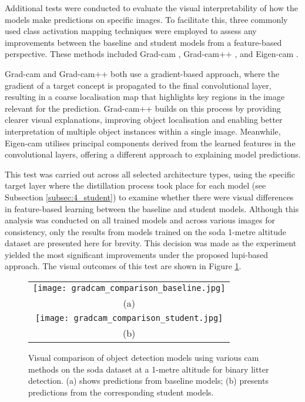 Additional tests were conducted to evaluate the visual interpretability of how the models make predictions on specific images. To facilitate this, three commonly used class activation mapping techniques were employed to assess any improvements between the baseline and student models from a feature-based perspective. These methods included Grad-\gls{cam} \cite{gradcam}, Grad-\gls{cam}++ \cite{gradcam_plus_plus}, and Eigen-\gls{cam} \cite{eigencam}.

Grad-\gls{cam} and Grad-\gls{cam}++ both use a gradient-based approach, where the gradient of a target concept is propagated to the final convolutional layer, resulting in a coarse localisation map that highlights key regions in the image relevant for the prediction. Grad-\gls{cam}++ builds on this process by providing clearer visual explanations, improving object localisation and enabling better interpretation of multiple object instances within a single image. Meanwhile, Eigen-\gls{cam} utilises principal components derived from the learned features in the convolutional layers, offering a different approach to explaining model predictions. 


This test was carried out across all selected architecture types, using the specific target layer where the distillation process took place for each model (see Subsection \ref{subsec:4_student}) to examine whether there were visual differences in feature-based learning between the baseline and student models. Although this analysis was conducted on all trained models and across various images for consistency, only the results from models trained on the \gls{soda} 1-metre altitude dataset are presented here for brevity. This decision was made as the experiment yielded the most significant improvements under the proposed \gls{lupi}-based approach. The visual outcomes of this test are shown in Figure \ref{fig:gradcam_comparison}.

\begin{figure}[!ht]
    \centering
    \begin{tabular}{c}
        \texttt{[image: gradcam\_comparison\_baseline.jpg]} \\
        \small (a) \\
        \addlinespace[1em]
        \texttt{[image: gradcam\_comparison\_student.jpg]} \\
        \small (b) \\
    \end{tabular}
    \caption{Visual comparison of object detection models using various \gls{cam} methods on the \gls{soda} dataset at a 1-metre altitude for binary litter detection. (a) shows predictions from baseline models; (b) presents predictions from the corresponding student models.}
    \label{fig:gradcam_comparison}
\end{figure}

